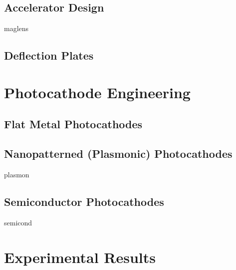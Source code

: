 \documentclass{uicthesi}
\begin{document}
\section{Accelerator Design}

  {maglens}

\section{Deflection Plates}

\chapter{Photocathode Engineering}

\section{Flat Metal Photocathodes}

\section{Nanopatterned (Plasmonic) Photocathodes}

  {plasmon}

\section{Semiconductor Photocathodes}

  {semicond}

\chapter{Experimental Results}

 


\end{document}
